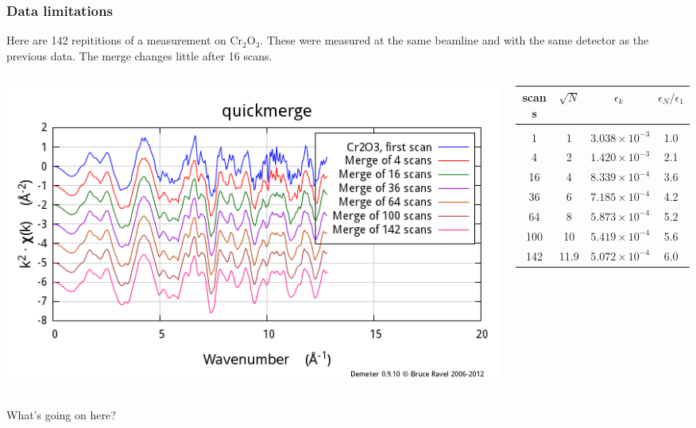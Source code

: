 \documentclass[10pt, xcolor=x11names, compress]{beamer}
\begin{document}
\begin{frame}
  \frametitle{Data limitations}
  Here are 142 repititions of a measurement on Cr$_2$O$_3$.  These
  were measured at the same beamline and with the same detector as the
  previous data.  The merge changes little after 16 scans.

  \bigskip

  \begin{columns}[T]
    \begin{column}{0.5\linewidth}
      \includegraphics[width=\linewidth]{images/cr2o3.png}
    \end{column}
    \begin{column}{0.5\linewidth}
      \small
      \begin{tabular}[h]{cccc}
        scans & $\sqrt{N}$ & $\epsilon_k$ & $\epsilon_N/\epsilon_1$ \\
        \hline\\
        1   & 1  & $3.038\times 10^{-3}$ & 1.0 \\
        4   & 2  & $1.420\times 10^{-3}$ & 2.1 \\
        16  & 4  & $8.339\times 10^{-4}$ & 3.6 \\
        36  & 6  & $7.185\times 10^{-4}$ & 4.2 \\
        64  & 8  & $5.873\times 10^{-4}$ & 5.2 \\
        100 & 10 & $5.419\times 10^{-4}$ & 5.6 \\
        142 & 11.9 & $5.072\times 10^{-4}$ & 6.0
      \end{tabular}
    \end{column}
  \end{columns}

  \bigskip

  \begin{alertblock}{}
    \centering What's going on here?
  \end{alertblock}
\end{frame}
\end{document}
